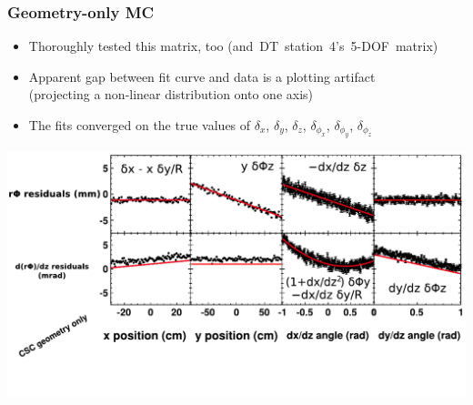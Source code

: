 \documentclass[compress]{beamer}
\begin{document}
\begin{frame}
\frametitle{Geometry-only MC}

\vspace{0.25 cm}
\begin{itemize}
\item Thoroughly tested this matrix, too \mbox{(and DT station 4's 5-DOF matrix)\hspace{-1 cm}}
\item Apparent gap between fit curve and data is a plotting artifact \\ (projecting a non-linear distribution onto one axis)
\item The fits converged on the true values of $\delta_x$, $\delta_y$, $\delta_z$, $\delta_{\phi_x}$, $\delta_{\phi_y}$, $\delta_{\phi_z}$
\end{itemize}

\vspace{0.5 cm}
\includegraphics[width=\linewidth]{geometryonly_csc.pdf}
\end{frame}
\end{document}
